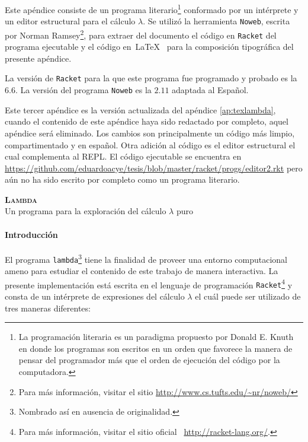 Este apéndice consiste de un programa literario\footnote{La programación literaria es un paradigma propuesto por Donald E. Knuth en donde los programas son escritos en un orden que favorece la manera de pensar del programador más que el orden de ejecución del código por la computadora.} conformado por un intérprete y un editor estructural para el cálculo \( λ \). Se utilizó la herramienta \texttt{Noweb}, escrita por Norman Ramsey\footnote{Para más información, visitar el sitio \url{http://www.cs.tufts.edu/~nr/noweb/}}, para extraer del documento el código en \texttt{Racket} del programa ejecutable y el código en~\LaTeX~ para la composición tipográfica del presente apéndice.

La versión de \texttt{Racket} para la que este programa fue programado y probado es la \( 6.6 \). La versión del programa \texttt{Noweb} es la \( 2.11 \) adaptada al Español.

\begin{Eduardo}
Este tercer apéndice es la versión actualizada del apéndice \ref{ap:texlambda}, cuando el contenido de este apéndice haya sido redactado por completo, aquel apéndice será eliminado. Los cambios son principalmente un código más limpio, compartimentado y en español. Otra adición al código es el editor estructural el cual complementa al REPL. El código ejecutable se encuentra en \url{https://github.com/eduardoacye/tesis/blob/master/racket/progs/editor2.rkt} pero aún no ha sido escrito por completo como un programa literario.
\end{Eduardo}

\newpage
\begin{center}
  \vspace*{10pt}
  {\Huge\textbf{\textsc{Lambda}}}\\
  \vspace*{5pt}
  {\large Un programa para la exploración del cálculo \( λ \) puro}
  \vspace*{10pt}
\end{center}

\paragraph{Introducción}

El programa {\tt{}lambda}\footnote{Nombrado así en ausencia de originalidad.} tiene la finalidad de proveer una entorno computacional ameno para estudiar el contenido de este trabajo de manera interactiva. La presente implementación está escrita en el lenguaje de programación {\tt{}Racket}\footnote{Para más información, visitar el sitio oficial ~\url{http://racket-lang.org/}.} y consta de un intérprete de expresiones del cálculo \( λ \) el cuál puede ser utilizado de tres maneras diferentes:

